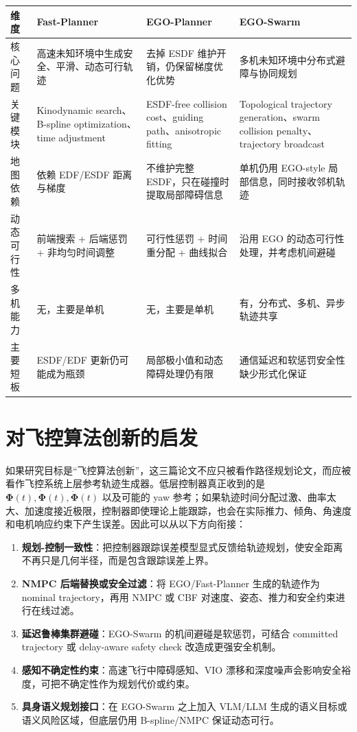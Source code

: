 \documentclass[UTF8,a4paper,12pt]{ctexart}
\newcommand{\traj}{\boldsymbol{\Phi}}
\begin{document}
\begin{longtable}{p{3.0cm}p{3.8cm}p{3.8cm}p{3.8cm}}
\toprule
\textbf{维度} & \textbf{Fast-Planner} & \textbf{EGO-Planner} & \textbf{EGO-Swarm}\\
\midrule
\endhead
核心问题 & 高速未知环境中生成安全、平滑、动态可行轨迹 & 去掉 ESDF 维护开销，仍保留梯度优化优势 & 多机未知环境中分布式避障与协同规划\\
\midrule
关键模块 & Kinodynamic search、B-spline optimization、time adjustment & ESDF-free collision cost、guiding path、anisotropic fitting & Topological trajectory generation、swarm collision penalty、trajectory broadcast\\
\midrule
地图依赖 & 依赖 EDF/ESDF 距离与梯度 & 不维护完整 ESDF，只在碰撞时提取局部障碍信息 & 单机仍用 EGO-style 局部信息，同时接收邻机轨迹\\
\midrule
动态可行性 & 前端搜索 + 后端惩罚 + 非均匀时间调整 & 可行性惩罚 + 时间重分配 + 曲线拟合 & 沿用 EGO 的动态可行性处理，并考虑机间避碰\\
\midrule
多机能力 & 无，主要是单机 & 无，主要是单机 & 有，分布式、多机、异步轨迹共享\\
\midrule
主要短板 & ESDF/EDF 更新仍可能成为瓶颈 & 局部极小值和动态障碍处理仍有限 & 通信延迟和软惩罚安全性缺少形式化保证\\
\bottomrule
\end{longtable}

\section{对飞控算法创新的启发}

如果研究目标是“飞控算法创新”，这三篇论文不应只被看作路径规划论文，而应被看作飞控系统上层参考轨迹生成器。低层控制器真正收到的是 $\traj(t),\dot{\traj}(t),\ddot{\traj}(t)$ 以及可能的 yaw 参考；如果轨迹时间分配过激、曲率太大、加速度接近极限，控制器即使理论上能跟踪，也会在实际推力、倾角、角速度和电机响应约束下产生误差。因此可以从以下方向衔接：

\begin{enumerate}
  \item \textbf{规划-控制一致性}：把控制器跟踪误差模型显式反馈给轨迹规划，使安全距离不再只是几何半径，而是包含跟踪误差上界。
  \item \textbf{NMPC 后端替换或安全过滤}：将 EGO/Fast-Planner 生成的轨迹作为 nominal trajectory，再用 NMPC 或 CBF 对速度、姿态、推力和安全约束进行在线过滤。
  \item \textbf{延迟鲁棒集群避碰}：EGO-Swarm 的机间避碰是软惩罚，可结合 committed trajectory 或 delay-aware safety check 改造成更强安全机制。
  \item \textbf{感知不确定性约束}：高速飞行中障碍感知、VIO 漂移和深度噪声会影响安全裕度，可把不确定性作为规划代价或约束。
  \item \textbf{具身语义规划接口}：在 EGO-Swarm 之上加入 VLM/LLM 生成的语义目标或语义风险区域，但底层仍用 B-spline/NMPC 保证动态可行。
\end{enumerate}
\end{document}
